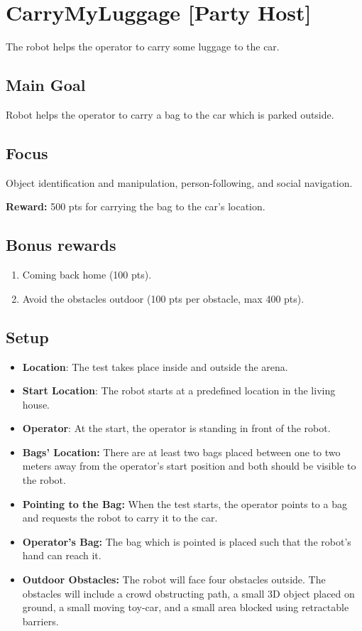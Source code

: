 \section{CarryMyLuggage [Party Host]}
The robot helps the operator to carry some luggage to the car.

\subsection{Main Goal}
Robot helps the operator to carry a bag to the car which is parked outside.

\subsection{Focus}
Object identification and manipulation, person-following, and social navigation.

\noindent\textbf{Reward:} 500 pts for carrying the bag to the car's location.

\subsection{Bonus rewards}
\begin{enumerate}[nosep]
	\item Coming back home (100 pts).
	\item Avoid the obstacles outdoor (100 pts per obstacle, max 400 pts).
\end{enumerate}


\subsection{Setup}
\begin{itemize}
	\item \textbf{Location}: The test takes place inside and outside the arena.

	\item \textbf{Start Location}: The robot starts at a predefined location in the living house.

	\item \textbf{Operator}: At the start, the operator is standing in front of the robot.
	
	\item \textbf{Bags' Location:} There are at least two bags placed between one to two meters away from the operator's start position and both should be visible to the robot.
	
	\item \textbf{Pointing to the Bag:} When the test starts, the operator points to a bag and requests the robot to carry it to the car.
	
	\item \textbf{Operator's Bag:} The bag which is pointed is placed such that the robot's hand can reach it.
	
	\item \textbf{Outdoor Obstacles:} The robot will face four obstacles outside. The obstacles will include a crowd obstructing path, a small 3D object placed on ground, a small moving toy-car, and a small area blocked using retractable barriers.
\end{itemize}

